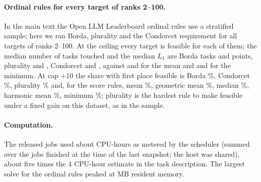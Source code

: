 \paragraph{Ordinal rules for every target of ranks 2--100.} In the main text the Open LLM Leaderboard ordinal rules use a stratified sample; here we ran Borda, plurality and the Condorcet requirement for all \cvxOllbLinearN{} targets of ranks 2--100. At the ceiling every target is feasible for each of them; the median number of tasks touched and the median $L_1$ are Borda \ordHundredCeilBordaK{} tasks and \ordHundredCeilBordaL{} points, plurality \ordHundredCeilPluralityK{} and \ordHundredCeilPluralityL, Condorcet \ordHundredCeilCondorcetK{} and \ordHundredCeilCondorcetL, against \ordHundredCeilMeanK{} and \ordHundredCeilMeanL{} for the mean and \ordHundredCeilMinK{} and \ordHundredCeilMinL{} for the minimum. At cap $+10$ the share with first place feasible is Borda \ordHundredTenBordaFeas\%, Condorcet \ordHundredTenCondorcetFeas\%, plurality \ordHundredTenPluralityFeas\% and, for the score rules, mean \ordHundredTenMeanFeas\%, geometric mean \ordHundredTenGeomeanFeas\%, median \ordHundredTenMedianFeas\%, harmonic mean \ordHundredTenHarmonicFeas\%, minimum \ordHundredTenMinFeas\%; plurality is the hardest rule to make feasible under a fixed gain on this dataset, as in the sample.

\paragraph{Computation.} The released jobs used about \cpuHours{} CPU-hours as metered by the scheduler (summed over the jobs finished at the time of the last snapshot; the host was shared), about five times the 4 CPU-hour estimate in the task description. The largest solve for the ordinal rules peaked at \peakMemMB{} MB resident memory.


